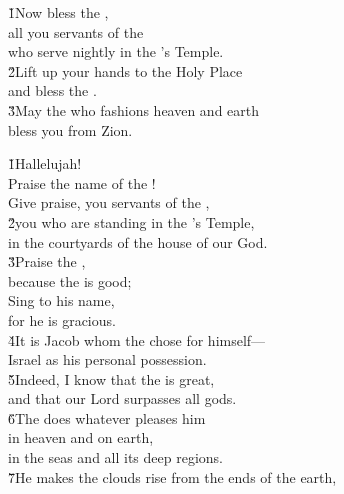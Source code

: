 \begin{poetry}
\poeml \v{1}Now bless the , \\
\poemll    all you servants of the  \\
\poemlll       who serve nightly in the 's Temple. \\
\poeml \v{2}Lift up your hands to the Holy Place \\
\poemll    and bless the . \\
\poeml \v{3}May the  who fashions heaven and earth \\
\poemll    bless you from Zion.
\end{poetry}

\begin{poetry}
\poeml \v{1}Hallelujah! \\
\poemll    Praise the name of the ! \\
\poeml Give praise, you servants of the , \\
\poeml \v{2}you who are standing in the 's Temple, \\
\poemlll       in the courtyards of the house of our God. \\
\poeml \v{3}Praise the , \\
\poemll    because the  is good; \\
\poeml Sing to his name, \\
\poemll    for he is gracious. \\
\poeml \v{4}It is Jacob whom the  chose for himself--- \\
\poemll    Israel as his personal possession. \\
\poeml \v{5}Indeed, I know that the  is great, \\
\poemll    and that our Lord surpasses all gods. \\
\poeml \v{6}The  does whatever pleases him \\
\poemll    in heaven and on earth, \\
\poemlll       in the seas and all its deep regions. \\
\poeml \v{7}He makes the clouds rise from the ends of the earth, \\

\end{poetry}
